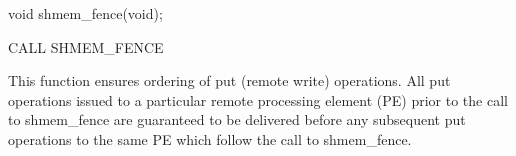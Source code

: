 \synC   %
 
 void shmem_fence(void);

\synF   %

 CALL SHMEM_FENCE

{
    This  function ensures ordering of put (remote write) operations. All
    put operations issued to a particular remote  processing element (PE)
    prior  to the call to shmem\_fence are guaranteed to be delivered before
    any subsequent put operations to the same PE which follow the  call  to
    shmem\_fence.
}
{

} %

\eAPI

